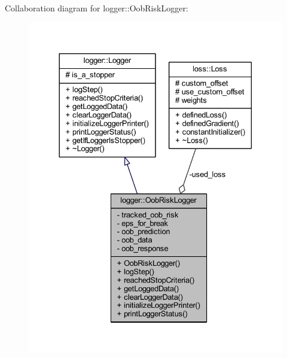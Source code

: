 Collaboration diagram for logger\+:\+:Oob\+Risk\+Logger\+:\nopagebreak
\begin{figure}[H]
\begin{center}
\leavevmode
\includegraphics[width=330pt]{classlogger_1_1_oob_risk_logger__coll__graph}
\end{center}
\end{figure}
